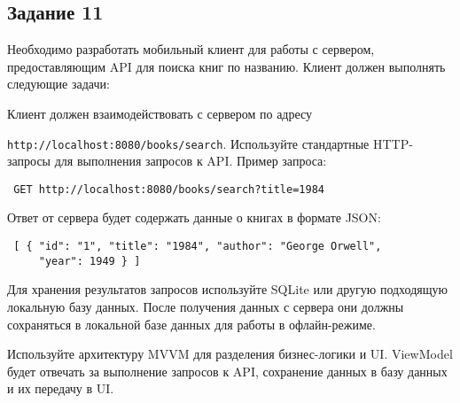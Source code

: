 \documentclass[a4paper,12pt]{article}
\begin{document}
\subsection*{Задание 11}

Необходимо разработать мобильный клиент для работы с сервером, предоставляющим API для поиска книг по названию. Клиент должен выполнять следующие задачи:


Клиент должен взаимодействовать с сервером по адресу 

\texttt{http://localhost:8080/books/search}. Используйте стандартные HTTP-запросы для выполнения запросов к API. Пример запроса:

\begin{verbatim} GET http://localhost:8080/books/search?title=1984 \end{verbatim}

Ответ от сервера будет содержать данные о книгах в формате JSON:

\begin{verbatim} [ { "id": "1", "title": "1984", "author": "George Orwell",
     "year": 1949 } ] \end{verbatim}


Для хранения результатов запросов используйте SQLite или другую подходящую локальную базу данных. После получения данных с сервера они должны сохраняться в локальной базе данных для работы в офлайн-режиме.


Используйте архитектуру MVVM для разделения бизнес-логики и UI. ViewModel будет отвечать за выполнение запросов к API, сохранение данных в базу данных и их передачу в UI.
\end{document}
